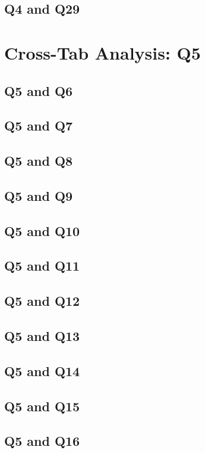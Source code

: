 \documentclass{report}
\begin{document}
\section{Q4 and Q29}\clearpage

\chapter{Cross-Tab Analysis: Q5}

\section{Q5 and Q6}\clearpage
\section{Q5 and Q7}\clearpage
\section{Q5 and Q8}\clearpage
\section{Q5 and Q9}\clearpage
\section{Q5 and Q10}\clearpage
\section{Q5 and Q11}\clearpage
\section{Q5 and Q12}\clearpage
\section{Q5 and Q13}\clearpage
\section{Q5 and Q14}\clearpage
\section{Q5 and Q15}\clearpage
\section{Q5 and Q16}\clearpage
\end{document}
